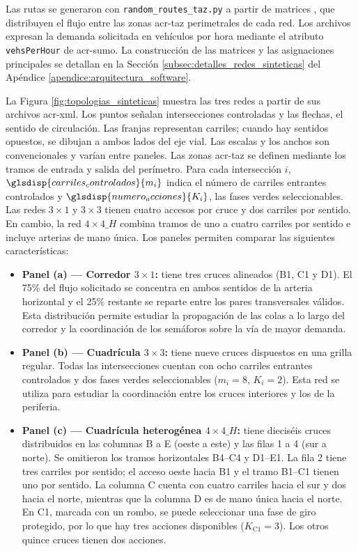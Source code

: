 Las rutas se generaron con \texttt{random\_}\allowbreak\texttt{routes\_}\allowbreak\texttt{taz.py} a partir de matrices , que distribuyen el flujo entre las zonas \acrshort{acr-taz} perimetrales de cada red. Los archivos expresan la demanda solicitada en vehículos por hora mediante el atributo \texttt{vehsPerHour} de \acrshort{acr-sumo}. La construcción de las matrices y las asignaciones principales se detallan en la Sección \ref{subsec:detalles_redes_sinteticas} del Apéndice \ref{apendice:arquitectura_software}.

La Figura \ref{fig:topologias_sinteticas} muestra las tres redes a partir de sus archivos \acrshort{acr-xml}. Los puntos señalan intersecciones controladas y las flechas, el sentido de circulación. Las franjas representan carriles; cuando hay sentidos opuestos, se dibujan a ambos lados del eje vial. Las escalas y los anchos son convencionales y varían entre paneles. Las zonas \acrshort{acr-taz} se definen mediante los tramos de entrada y salida del perímetro. Para cada intersección $i$, $\glsdisp{carriles_controlados}{m_i}$ indica el número de carriles entrantes controlados y $\glsdisp{numero_acciones}{K_i}$, las fases verdes seleccionables. Las redes $3\times1$ y $3\times3$ tienen cuatro accesos por cruce y dos carriles por sentido. En cambio, la red $4\times4\_H$ combina tramos de uno a cuatro carriles por sentido e incluye arterias de mano única.
Los paneles permiten comparar las siguientes características:

\begin{itemize}
    \item \textbf{Panel (a) — Corredor $3\times1$:} tiene tres cruces alineados (B1, C1 y D1). El 75\% del flujo solicitado se concentra en ambos sentidos de la arteria horizontal y el 25\% restante se reparte entre los pares transversales válidos. Esta distribución permite estudiar la propagación de las \glspl{cola} a lo largo del corredor y la coordinación de los semáforos sobre la vía de mayor demanda.
    \item \textbf{Panel (b) — Cuadrícula $3\times3$:} tiene nueve cruces dispuestos en una grilla regular. Todas las intersecciones cuentan con ocho carriles entrantes controlados y dos fases verdes seleccionables ($m_i=8$, $K_i=2$). Esta red se utiliza para estudiar la coordinación entre los cruces interiores y los de la periferia.
    \item \textbf{Panel (c) — Cuadrícula heterogénea $4\times4\_H$:} tiene dieciséis cruces distribuidos en las columnas B a E (oeste a este) y las filas 1 a 4 (sur a norte). Se omitieron los tramos horizontales B4--C4 y D1--E1. La fila 2 tiene tres carriles por sentido; el acceso oeste hacia B1 y el tramo B1--C1 tienen uno por sentido. La columna C cuenta con cuatro carriles hacia el sur y dos hacia el norte, mientras que la columna D es de mano única hacia el norte. En C1, marcada con un rombo, se puede seleccionar una fase de giro protegido, por lo que hay tres acciones disponibles ($K_{\text{C1}}=3$). Los otros quince cruces tienen dos acciones.
\end{itemize}

